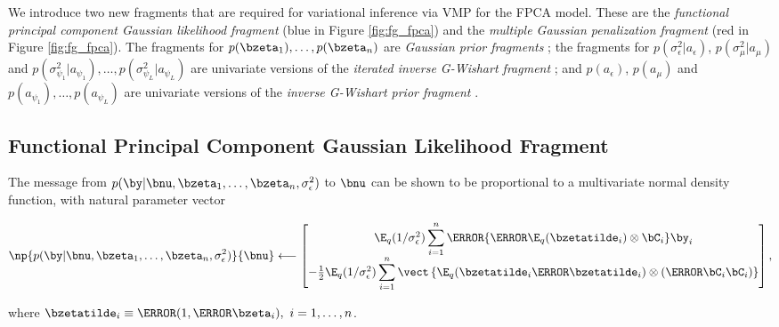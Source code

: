 \documentclass[ba]{imsart}
\numberwithin{equation}{section}
\theoremstyle{plain}
\def\sigsqeps{\sigma^2_{\epsilon}}
\def\aeps{a_{\epsilon}}
\def\sigsqmu{\sigma^2_{\mu}}
\def\amu{a_{\mu}}
\newcommand\sigsqpsi[1]{\sigma^2_{\psi_{#1}}}
\newcommand\apsi[1]{a_{\psi_{#1}}}
\begin{document}
We introduce two new fragments that are required for variational inference via VMP for the FPCA model. These
are the \emph{functional principal component Gaussian likelihood fragment} (blue in Figure \ref{fig:fg_fpca})
and the \emph{multiple Gaussian penalization fragment} (red in Figure \ref{fig:fg_fpca}).
The fragments for $p (\bzeta_1), \dots, p (\bzeta_n)$ are \emph{Gaussian prior fragments}
\cite[Section~4.1.1]{wand17}; the fragments for $p (\sigsqeps | \aeps)$, $p (\sigsqmu | \amu)$ and
$p (\sigsqpsi{1} | \apsi{1}), \dots, p (\sigsqpsi{L} | \apsi{L})$ are univariate versions of the \emph{iterated inverse
G-Wishart fragment} \cite[Algorithm~2]{maestrini20}; and $p (\aeps)$, $p (\amu)$ and $p (\apsi{1}), \dots, p (\apsi{L})$
are univariate versions of the \emph{inverse G-Wishart prior fragment} \cite[Algorithm~1]{maestrini20}.


\subsection{Functional Principal Component Gaussian Likelihood Fragment}
\label{sec:fpca_gauss_lik_frag}

The message from $p (\by | \bnu, \bzeta_1, \dots, \bzeta_n, \sigsqeps)$ to $\bnu$ can be shown to be
proportional to a multivariate normal density function, with natural parameter vector

\begin{equation}
	\np{p (\by | \bnu, \bzeta_1, \dots, \bzeta_n, \sigsqeps)}{\bnu}
		\longleftarrow
			\begin{bmatrix}
				\E_q (1/\sigsqeps) \displaystyle\sum_{i=1}^n \T{\left\{
					\T{\E_q (\bzetatilde_i)} \otimes \bC_i
				\right\}} \by_i \\
				-\frac12 \E_q (1/\sigsqeps) \displaystyle\sum_{i=1}^n \vect \left\{
					\E_q (\bzetatilde_i \T{\bzetatilde_i}) \otimes (\T{\bC_i} \bC_i)
				\right\}
			\end{bmatrix},
\label{np_lik_nu}
\end{equation}

\noindent where $\bzetatilde_i \equiv \T{(1, \T{\bzeta_i})}, \ i = 1, \dots, n$.

\end{document}

